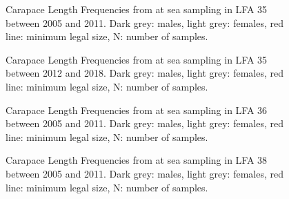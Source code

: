 \documentclass[11pt]{article}
\newcommand{\e}{/SpinDr/backup/bio_data/bio.lobster/figures/LFA3438Framework2019/} %
\begin{document}
    \begin{figure}
    \centering
        \caption{Carapace Length Frequencies from at sea sampling in LFA 35 between 2005 and 2011. Dark grey: males, light grey: females, red line: minimum legal size, N: number of samples.}

    \end{figure}

   \begin{figure}
    \centering
        \caption{Carapace Length Frequencies from at sea sampling in LFA 35 between 2012 and 2018. Dark grey: males, light grey: females, red line: minimum legal size, N: number of samples.}

    \end{figure}

   \begin{figure}
    \centering
        \caption{Carapace Length Frequencies from at sea sampling in LFA 36 between 2005 and 2011. Dark grey: males, light grey: females, red line: minimum legal size, N: number of samples.}

    \end{figure}

   \begin{figure}
    \centering
        \caption{Carapace Length Frequencies from at sea sampling in LFA 38 between 2005 and 2011. Dark grey: males, light grey: females, red line: minimum legal size, N: number of samples.}

    \end{figure}


\end{document}
